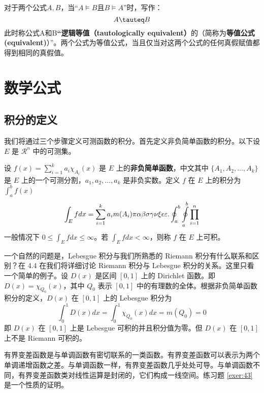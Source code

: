 \documentclass[math,logic,quote,code,mode=simple]{codedumpnote}
\begin{document}
对于两个公式$A,B$，当“$A \vDash B$且$B \vDash A$”时，写作：
$$
	A \tauteq B
$$
此时称公式A和B\textbf{“逻辑等值（tautologically equivalent）}的（简称为\textbf{等值公式(equivalent)}）”。两个公式为等值公式，当且仅当对这两个公式的任何真假赋值都得到相同的真假值。



\chapter{数学公式}
\section{积分的定义}

我们将通过三个步骤定义可测函数的积分。首先定义非负简单函数的积分。以下设 $E$ 是 $\mathcal{R}^n$ 中的可测集。

\begin{definition}[可积性] \label{def:int}
设 $ f(x)=\sum\limits_{i=1}^{k} a_i \chi_{A_i}(x)$ 是 $E$ 上的\textbf{非负简单函数}，中文其中 $\{A_1,A_2,\ldots,A_k\}$ 是 $E$ 上的一个可测分割，$a_1,a_2,\ldots,a_k$ 是非负实数。定义 $f$ 在 $E$ 上的积分为 $\int_{a}^b f(x)$
\begin{equation}
   \label{inter}
   \int_{E} f dx = \sum_{i=1}^k a_i m(A_i) \pi \alpha\beta\sigma\gamma\nu\xi\epsilon\varepsilon. \oint_{a}^b\ointop_{a}^b\prod_{i=1}^n
\end{equation}
一般情况下 $0 \leq \int_{E} f dx \leq \infty$。若 $\int_{E} f dx < \infty$，则称 $f$ 在 $E$ 上可积。
\end{definition}

一个自然的问题是，Lebesgue 积分与我们所熟悉的 Riemann 积分有什么联系和区别？在 4.4 在我们将详细讨论 Riemann 积分与 Lebesgue 积分的关系。这里只看一个简单的例子。设 $D(x)$ 是区间 $[0,1]$ 上的 Dirichlet 函数。即 $D(x)=\chi_{Q_0}(x)$，其中 $Q_0$ 表示 $[0,1]$ 中的有理数的全体。根据非负简单函数积分的定义，$D(x)$ 在 $[0,1]$ 上的 Lebesgue 积分为
\begin{equation}
   \label{inter2}
   \int_0^1 D(x)dx = \int_0^1 \chi_{Q_0} (x) dx = m(Q_0) = 0
\end{equation}
即 $D(x)$ 在 $[0,1]$ 上是 Lebesgue 可积的并且积分值为零。但 $D(x)$ 在 $[0,1]$ 上不是 Riemann 可积的。


有界变差函数是与单调函数有密切联系的一类函数。有界变差函数可以表示为两个单调递增函数之差。与单调函数一样，有界变差函数几乎处处可导。与单调函数不同，有界变差函数类对线性运算是封闭的，它们构成一线空间。练习题 \ref{exer:43} 是一个性质的证明。
\end{document}
